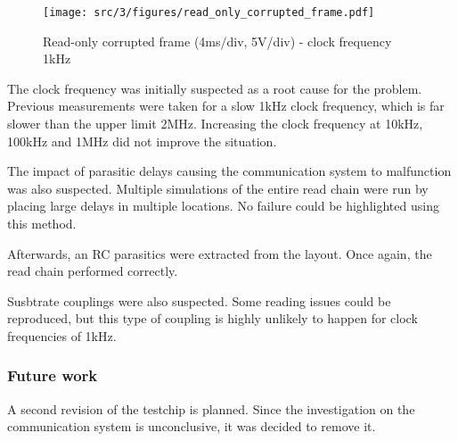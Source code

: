 \begin{figure}[!h]
  \centering
  \texttt{[image: src/3/figures/read\_only\_corrupted\_frame.pdf]}
  \caption{Read-only corrupted frame (4ms/div, 5V/div) - clock frequency 1kHz}
  \label{fig:read-only-full-frame}
\end{figure}

The clock frequency was initially suspected as a root cause for the problem.
Previous measurements were taken for a slow 1kHz clock frequency, which is far slower than the upper limit 2MHz.
Increasing the clock frequency at 10kHz, 100kHz and 1MHz did not improve the situation.

The impact of parasitic delays causing the communication system to malfunction was also suspected.
Multiple simulations of the entire read chain were run by placing large delays in multiple locations.
No failure could be highlighted using this method.

Afterwards, an RC parasitics were extracted from the layout.
Once again, the read chain performed correctly.

Susbtrate couplings were also suspected.
Some reading issues could be reproduced, but this type of coupling is highly unlikely to happen for clock frequencies of 1kHz.


\subsubsection{Future work}

A second revision of the testchip is planned.
Since the investigation on the communication system is unconclusive, it was decided to remove it.
